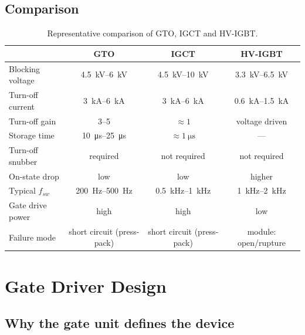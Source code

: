 \documentclass[11pt,a4paper]{report}
\begin{document}
\section{Comparison}

\begin{table}[htbp]
\centering
\caption{Representative comparison of GTO, IGCT and HV-IGBT.}
\label{tab:compare}
\begin{tabular}{lccc}
\toprule
 & \textbf{GTO} & \textbf{IGCT} & \textbf{HV-IGBT} \\
\midrule
Blocking voltage        & \SIrange{4.5}{6}{\kilo\volt} & \SIrange{4.5}{10}{\kilo\volt} & \SIrange{3.3}{6.5}{\kilo\volt} \\
Turn-off current        & \SIrange{3}{6}{\kilo\ampere} & \SIrange{3}{6}{\kilo\ampere}  & \SIrange{0.6}{1.5}{\kilo\ampere} \\
Turn-off gain           & \numrange{3}{5}              & $\approx 1$                   & voltage driven \\
Storage time            & \SIrange{10}{25}{\micro\second} & $\approx\SI{1}{\micro\second}$ & --- \\
Turn-off snubber        & required                     & not required                  & not required \\
On-state drop           & low                          & low                           & higher \\
Typical $f_{sw}$        & \SIrange{200}{500}{\hertz}   & \SIrange{0.5}{1}{\kilo\hertz} & \SIrange{1}{2}{\kilo\hertz} \\
Gate drive power        & high                         & high                          & low \\
Failure mode            & short circuit (press-pack)   & short circuit (press-pack)    & module: open/rupture \\
\bottomrule
\end{tabular}
\end{table}

\chapter{Gate Driver Design}
\label{ch:gatedriver}

\section{Why the gate unit defines the device}
\end{document}
